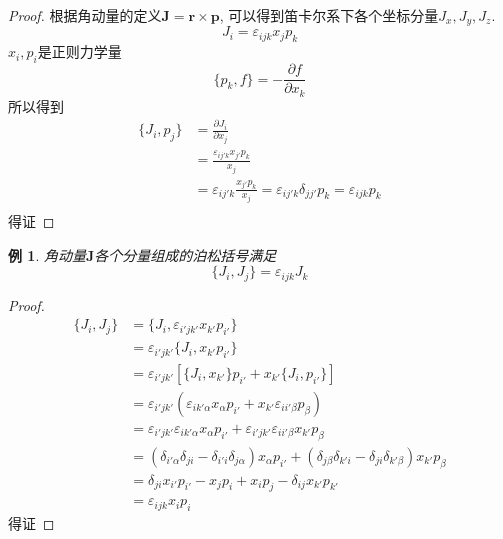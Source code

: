 \documentclass[a4paper,11pt]{book}
\newtheorem{proof}{证明}[section]
\newtheorem{example}{例}[section]
\begin{document}
\begin{proof}
  根据角动量的定义$\mathbf{J}=\mathbf{r}\times\mathbf{p}$, 可以得到笛卡尔系下各个坐标分量$J_x,J_y,J_z$.
\begin{equation*}
  J_i=\varepsilon_{ijk}x_jp_k
\end{equation*}
$x_i,p_i$是正则力学量
\begin{equation*}
  \{p_k,f\}=-\frac{\partial f}{\partial{x_k}}
\end{equation*}
所以得到
\begin{equation*}
  \begin{split}
     \{J_i,p_j\}&=\frac{\partial J_i}{\partial{x_j}} \\
       &=\frac{\varepsilon_{ij'k}x_{j'}p_k}{x_j} \\
       &=\varepsilon_{ij'k}\frac{x_{j'}p_k}{x_j}=\varepsilon_{ij'k}\delta_{jj'}p_k=\varepsilon_{ijk}p_k \\
  \end{split}
\end{equation*}
得证
\end{proof}
\begin{example}
  角动量$\mathbf{J}$各个分量组成的泊松括号满足
\begin{equation*}
  \{J_i,J_j\}=\varepsilon_{ijk}J_k
\end{equation*}
\end{example}
\begin{proof}
\begin{equation*}
  \begin{split}
     \{J_i,J_j\}&=\{J_i,\varepsilon_{i'jk'}x_{k'}p_{i'}\} \\
       &=\varepsilon_{i'jk'}\{J_i,x_{k'}p_{i'}\} \\
       &=\varepsilon_{i'jk'}\left[\{J_{i},x_{k'}\}p_{i'}+x_{k'}\{J_i,p_{i'}\}\right] \\
       &=\varepsilon_{i'jk'}\left(\varepsilon_{ik'\alpha}x_\alpha p_{i'}+x_{k'}\varepsilon_{ii'\beta}p_\beta\right) \\
       &=\varepsilon_{i'jk'}\varepsilon_{ik'\alpha}x_\alpha p_{i'}+\varepsilon_{i'jk'}\varepsilon_{ii'\beta}x_{k'}p_\beta \\
       &=\left(\delta_{i'\alpha}\delta_{ji}-\delta_{i'i}\delta_{j\alpha}\right)x_\alpha p_{i'}+\left(\delta_{j\beta}\delta_{k'i}-\delta_{ji}\delta_{k'\beta}\right)x_{k'}p_\beta \\
       &=\delta_{ji}x_{i'}p_{i'}-x_jp_i+x_ip_j-\delta_{ij}x_{k'}p_{k'} \\
       &=\varepsilon_{ijk}x_ip_i
  \end{split}
\end{equation*}
得证
\end{proof}
\end{document}
